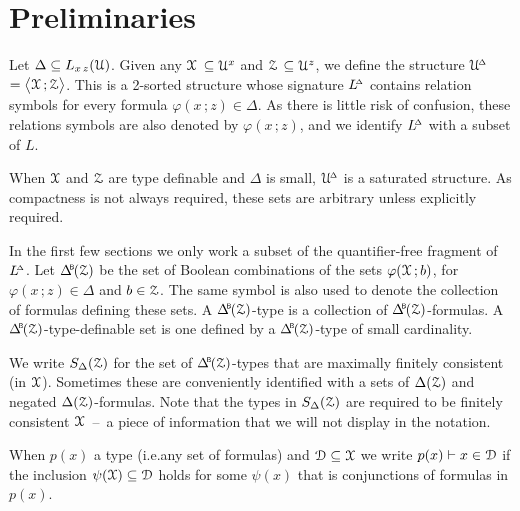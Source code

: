\section{Preliminaries}
\label{preliminaries}

\def\ceq#1#2#3{\noindent\parbox[t]{15ex}{$\displaystyle #1$}\parbox{6ex}{\hfil $#2$}{$\displaystyle #3$}}


Let $\Delta\subseteq L_{x\,z}(\EuScript U)$.
Given any \emph{$\EuScript X$\/} $\subseteq\EuScript U^x$ and \emph{$\EuScript Z$\/} $\subseteq\EuScript U^z$, we define the structure \emph{$\EuScript U\kern-.2ex^{\scriptscriptstyle\Delta}$\/} $=\big\langle\EuScript X\,;\EuScript Z\big\rangle$.
This is a 2-sorted structure whose signature \emph{$L\kern-.4ex^{\scriptscriptstyle\Delta}$\/} contains relation symbols for every formula $\varphi(x\,;z)\in\Delta$.
As there is little risk of confusion, these relations symbols are also denoted by $\varphi(x\,;z)$, and we identify $L\kern-.4ex^{\scriptscriptstyle\Delta}$ with a subset of $L$.

When $\EuScript X$ and $\EuScript Z$ are type definable and $\Delta$ is small, $\EuScript U\kern-.2ex^{\scriptscriptstyle\Delta}$ is a saturated structure.
As compactness is not always required, these sets are arbitrary unless explicitly required.

In the first few sections we only work a subset of the quantifier-free fragment of $L\kern-.4ex^{\scriptscriptstyle\Delta}$.
Let $\BDelta(\Z)$ be the set of Boolean combinations of the sets $\varphi(\EuScript X\,;b)$, for $\varphi(x\,;z)\in\Delta$ and $b\in\EuScript Z$.
The same symbol is also used to denote the collection of formulas defining these sets.
A $\BDelta(\Z)$-type is a collection of $\BDelta(\Z)$-formulas.
A $\BDelta(\Z)$-type-definable set is one defined by a $\BDelta(\Z)$-type of small cardinality.

We write \emph{$S_\Delta(\EuScript Z)$\/} for the set of $\BDelta(\Z)$-types that are maximally finitely consistent (in $\EuScript X$).
Sometimes these are conveniently identified with a sets of $\Delta(\EuScript Z)$ and negated $\Delta(\EuScript Z)$-for\-mulas.
Note that the types in $S_\Delta(\EuScript Z)$ are required to be finitely consistent $\EuScript X$~--~a piece of information that we will not display in the notation.


When $p(x)$ a type (i.e.\@ any set of formulas) and $\EuScript D\subseteq\EuScript X$ we write $p(x)\vdash x\in\EuScript D$ if the inclusion $\psi(\EuScript X)\subseteq\EuScript D$ holds for some $\psi(x)$ that is conjunctions of formulas in $p(x)$.


